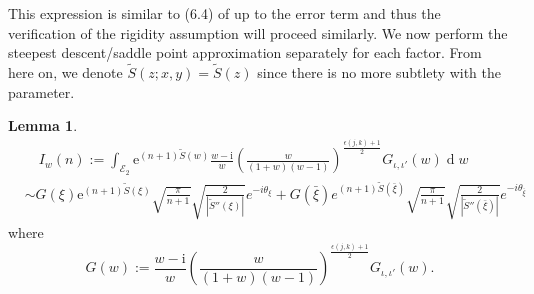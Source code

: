 \documentclass[12pt]{amsart}
\newcommand{\io}{{\iota}}
\newcommand{\tS}{{\widetilde S}}
\numberwithin{equation}{section}
\theoremstyle{definition}
\newtheorem{lemma}[thm]{Lemma}
\begin{document}
This expression is similar to (6.4) of \cite{tower_AD_perfect} up to the error term and thus the verification of the rigidity assumption will proceed similarly. We now perform the steepest descent/saddle point approximation separately for each factor. From here on, we denote $\tS(z; x,y)=\tS(z)$ since there is no more subtlety with the parameter.

\begin{lemma}
    \label{lemma: steepest_descent_lemma}
    \begin{equation}
      \label{eq: asymptotic of w integral 
}
\begin{aligned}
&\quad I_w(n):=\int_{\mathcal{E}_2}\mathrm e^{(n+1)\tS(w)}\frac{w-\mathrm i}{w}\left (\frac{w}{(1+w)(w-1)}\right )^{\frac{\epsilon(j,k)+1}{2}} G_{\io,\io'}(w)\operatorname{d}w\\
        &\sim G(\xi)\mathrm e^{(n+1) \tS(\xi)}\sqrt{\frac{\pi}{n+1}}\sqrt{\frac{2}{|\tS''(\xi)|}}e^{-i\theta_\xi}+G(\bar \xi)e^{(n+1) \tS(\bar \xi)}\sqrt{\frac{\pi}{n+1}}\sqrt{\frac{2}{|\tS''(\bar \xi)|}}e^{-i\theta_{\bar \xi}}
\end{aligned}
    \end{equation}
where $$G(w):=\frac{w-\mathrm i}{w}\left (\frac{w}{(1+w)(w-1)}\right )^{\frac{\epsilon(j,k)+1}{2}}  G_{\io,\io'}(w).$$
\end{lemma}
\end{document}
